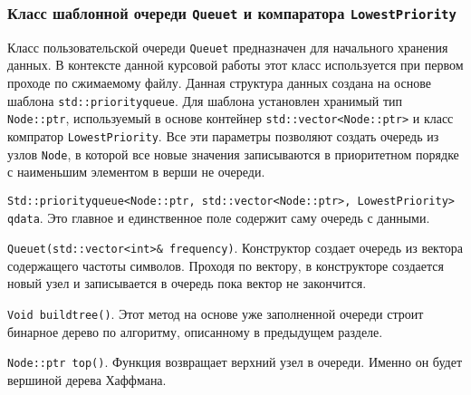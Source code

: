\subsubsection{Класс шаблонной очереди \texttt{Queue{\textunderscore}t} и компаратора \texttt{LowestPriority}}


Класс пользовательской очереди \texttt{Queue{\textunderscore}t} предназначен для начального хранения данных.
В контексте данной курсовой работы этот класс используется при первом проходе по сжимаемому файлу.
Данная структура данных создана на основе шаблона \texttt{std::priority{\textunderscore}queue}\cite{queue}.
Для шаблона установлен хранимый тип \texttt{Node::ptr}, используемый в основе контейнер \texttt{std::vector<Node::ptr>} и класс компратор \texttt{LowestPriority}\cite{queue}.
Все эти параметры позволяют создать очередь из узлов \texttt{Node}, в которой все новые значения записываются в приоритетном порядке с наименьшим элементом в верши не очереди.



\texttt{Std::priority{\textunderscore}queue<Node::ptr, std::vector<Node::ptr>, LowestPriority> q{\textunderscore}data}.
Это главное и единственное поле содержит саму очередь с данными.



\texttt{Queue{\textunderscore}t(std::vector<int>\& frequency)}.
Конструктор создает очередь из вектора содержащего частоты символов.
Проходя по вектору, в конструкторе создается новый узел и записывается в очередь пока вектор не закончится.



\texttt{Void build{\textunderscore}tree()}.
Этот метод на основе уже заполненной очереди строит бинарное дерево по алгоритму, описанному в предыдущем разделе.



\texttt{Node::ptr top()}.
Функция возвращает верхний узел в очереди. 
Именно он будет вершиной дерева Хаффмана.